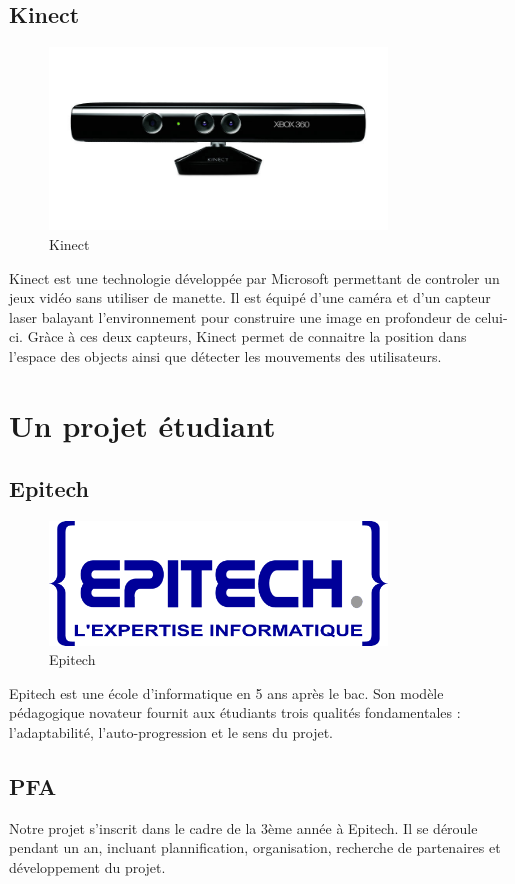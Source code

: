\documentclass[11pt]{report} %
\begin{document}
		\subsection{Kinect}
				\begin{figure}[htb]
				\centering
				\includegraphics[width=0.8\textwidth]{kinect.jpg}
				\caption{Kinect}
				\label{fig:kinect}
				\end{figure}
				Kinect est une technologie développée par Microsoft permettant de controler un jeux vidéo sans utiliser de manette. Il est équipé d'une caméra et d'un capteur laser balayant l'environnement pour construire une image en profondeur de celui-ci. Gràce à ces deux capteurs, Kinect permet de connaitre la position dans l'espace des objects ainsi que détecter les mouvements des utilisateurs.
	\section{Un projet étudiant}
		\subsection{Epitech}
			\begin{figure}[htb]
			\centering
			\includegraphics[width=0.8\textwidth]{epitech.png}
			\caption{Epitech}
			\label{fig:epitech}
			\end{figure}
			Epitech est une école d’informatique en 5 ans après le bac. Son modèle pédagogique novateur fournit aux étudiants trois qualités fondamentales : l’adaptabilité, l’auto-progression et le sens du projet.
		\subsection{PFA}
			Notre projet s'inscrit dans le cadre de la 3ème année à Epitech. Il se déroule pendant un an, incluant plannification, organisation, recherche de partenaires et développement du projet.\\
			
\end{document}
